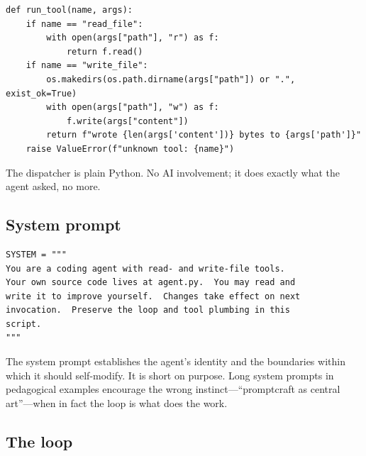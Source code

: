 \begin{lstlisting}
def run_tool(name, args):
    if name == "read_file":
        with open(args["path"], "r") as f:
            return f.read()
    if name == "write_file":
        os.makedirs(os.path.dirname(args["path"]) or ".", exist_ok=True)
        with open(args["path"], "w") as f:
            f.write(args["content"])
        return f"wrote {len(args['content'])} bytes to {args['path']}"
    raise ValueError(f"unknown tool: {name}")
\end{lstlisting}

The dispatcher is plain Python.  No AI involvement; it does
exactly what the agent asked, no more.

\subsection{System prompt}

\begin{lstlisting}
SYSTEM = """
You are a coding agent with read- and write-file tools.
Your own source code lives at agent.py.  You may read and
write it to improve yourself.  Changes take effect on next
invocation.  Preserve the loop and tool plumbing in this
script.
"""
\end{lstlisting}

The system prompt establishes the agent's identity and the
boundaries within which it should self-modify.  It is short
on purpose.  Long system prompts in pedagogical examples
encourage the wrong instinct---``promptcraft as central
art''---when in fact the loop is what does the work.

\subsection{The loop}

